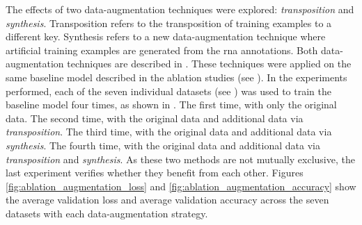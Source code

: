 
The effects of two data-augmentation techniques were
explored: \emph{transposition} and \emph{synthesis}.
Transposition refers to the transposition of training
examples to a different key. Synthesis refers to a new
data-augmentation technique where artificial training
examples are generated from the \gls{rna} annotations. Both
data-augmentation techniques are described in
. These techniques were applied on
the same baseline model described in the ablation studies
(see ). In the experiments
performed, each of the seven individual datasets (see
) was used to train the
baseline model four times, as shown in
. The first time, with only
the original data. The second time, with the original data
and additional data via \emph{transposition}. The third
time, with the original data and additional data via
\emph{synthesis}. The fourth time, with the original data
and additional data via \emph{transposition} and
\emph{synthesis}. As these two methods are not mutually
exclusive, the last experiment verifies whether they benefit
from each other. Figures
\ref{fig:ablation_augmentation_loss} and
\ref{fig:ablation_augmentation_accuracy} show the average
validation loss and average validation accuracy across the
seven datasets with each data-augmentation strategy.






